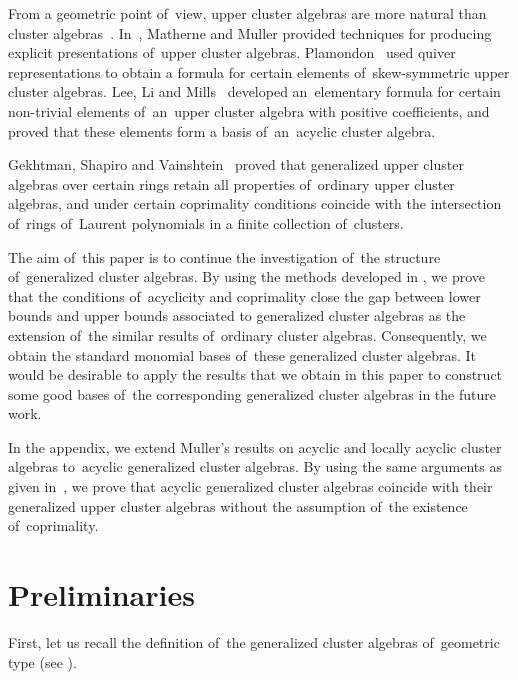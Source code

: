\documentclass[pdftex]{sigma}
\numberwithin{equation}{section}
\begin{document}
From a geometric point of~view, upper cluster algebras are more natural than cluster algebras~\cite{BMRS, GHK1}. In~\cite{MM15}, Matherne and Muller provided techniques for producing explicit presentations of~upper cluster algebras. Plamondon~\cite{P} used quiver representations to obtain a formula for certain elements of~skew-symmetric upper cluster algebras. Lee, Li and Mills~\cite{LLM} developed an~elementary formula for certain non-trivial elements of~an~upper cluster algebra with positive coefficients, and proved that these elements form a basis of~an~acyclic cluster algebra.

Gekhtman, Shapiro and Vainshtein~\cite{gsv18} proved that generalized upper cluster algebras over certain rings retain all properties of~ordinary upper cluster algebras, and under certain copri\-mality conditions coincide with the intersection of~rings of~Laurent polynomials in a finite collection of~clusters.

The aim of~this paper is to continue the investigation of~the structure of~generalized cluster algebras. By using the methods developed in \cite{bfz}, we prove that the conditions of~acyclicity and coprimality close the gap between lower bounds and upper bounds associated to generalized cluster algebras as the extension of~the similar results of~ordinary cluster algebras. Consequently, we obtain the standard monomial bases of~these generalized cluster algebras. It would be desi\-rable to apply the results that we obtain in this paper to construct some good bases of~the corresponding generalized cluster algebras in the future work.

In the appendix, we extend Muller's results on acyclic and locally acyclic cluster algebras to~acyclic generalized cluster algebras. By using the same arguments as given in~\cite{muller14}, we prove that acyclic generalized cluster algebras coincide with their generalized upper cluster algebras without the assumption of~the existence of~coprimality.


\section{Preliminaries}

First, let us recall the definition of~the generalized cluster algebras of~geometric type (see \cite{CS, gsv18}).
\end{document}
